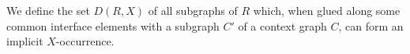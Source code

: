 

We define the set \(D(R,X)\) of all subgraphs of \( R \) which, when glued along some common interface elements with a subgraph $C'$ of a context graph \( C \), can form an implicit \( X \)-occurrence.

